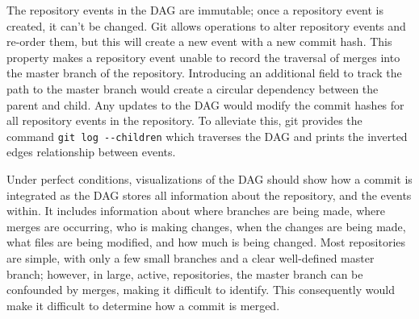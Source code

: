 The repository events in the DAG are immutable; once a repository event
is created, it can't be changed. Git allows operations to alter
repository events and re-order them, but this will create a new event
with a new commit hash. This property makes a repository event unable to
record the traversal of merges into the master branch of the repository.
Introducing an additional field to track the path to the master branch
would create a circular dependency between the parent and child. Any
updates to the DAG would modify the commit hashes for all repository
events in the repository. To alleviate this, git provides the command
\verb|git log --children| which traverses the DAG and prints the
inverted edges relationship between events.

Under perfect conditions, visualizations of the DAG should show how a
commit is integrated as the DAG stores all information about the
repository, and the events within. It includes information about where
branches are being made, where merges are occurring, who is making
changes, when the changes are being made, what files are being modified,
and how much is being changed. Most repositories are simple, with only a
few small branches and a clear well-defined master branch; however, in
large, active, repositories, the master branch can be confounded by
\foxtrot{} merges, making it difficult to identify. This consequently
would make it difficult to determine how a commit is merged.
